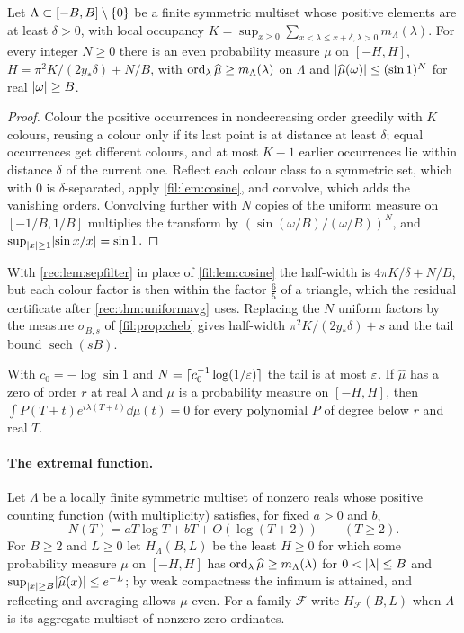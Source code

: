 \begin{theorem}\label{rec:thm:finitefilter}
Let $\Lambda\subset[-B,B]\setminus\{0\}$ be a finite symmetric multiset whose positive elements are at least $\delta>0$,
with local occupancy $K=\sup_{x\ge0}\sum_{x<\lambda\le x+\delta,\lambda>0}m_\Lambda(\lambda)$. For every integer $N\ge0$ there is an even
probability measure $\mu$ on $[-H,H]$, $H=\pi^2K/(2y_*\delta)+N/B$, with $\operatorname{ord}_\lambda\widehat\mu\ge m_\Lambda(\lambda)$ on $\Lambda$ and
$\lvert\widehat\mu(\omega)\rvert\le(\sin1)^N$ for real $\lvert\omega\rvert\ge B$.
\end{theorem}

\begin{proof}
Colour the positive occurrences in nondecreasing order greedily with $K$ colours, reusing a colour only
if its last point is at distance at least $\delta$; equal occurrences get different colours, and at most $K-1$
earlier occurrences lie within distance $\delta$ of the current one. Reflect each colour class to a symmetric
set, which with $0$ is $\delta$-separated, apply \cref{fil:lem:cosine}, and convolve, which adds the vanishing
orders. Convolving further with $N$ copies of the uniform measure on $[-1/B,1/B]$ multiplies the transform by
$(\sin(\omega/B)/(\omega/B))^N$, and $\sup_{\lvert x\rvert\ge1}\lvert\sin x/x\rvert=\sin1$.
\end{proof}

With \cref{rec:lem:sepfilter} in place of \cref{fil:lem:cosine} the half-width is $4\pi K/\delta+N/B$, but each
colour factor is then within the factor $\tfrac65$ of a triangle, which the residual certificate after
\cref{rec:thm:uniformavg} uses. Replacing the $N$ uniform factors by the measure $\sigma_{B,s}$ of
\cref{fil:prop:cheb} gives half-width $\pi^2K/(2y_*\delta)+s$ and the tail bound $\operatorname{sech}(sB)$.

With $c_0=-\log\sin1$ and $N=\lceil c_0^{-1}\log(1/\varepsilon)\rceil$ the tail is at most $\varepsilon$. If $\widehat\mu$ has a zero of order
$r$ at real $\lambda$ and $\mu$ is a probability measure on $[-H,H]$, then $\int P(T+t)e^{i\lambda(T+t)}\dd\mu(t)=0$ for every
polynomial $P$ of degree below $r$ and real $T$.

\paragraph{The extremal function.}
Let $\Lambda$ be a locally finite symmetric multiset of nonzero reals whose positive counting function
(with multiplicity) satisfies, for fixed $a>0$ and $b$,
\begin{equation}\label{fil:eq:count}
 N(T)=aT\log T+bT+O(\log(T+2))\qquad(T\ge2).
\end{equation}
For $B\ge2$ and $L\ge0$ let $H_\Lambda(B,L)$ be the least $H\ge0$ for which some probability measure $\mu$ on
$[-H,H]$ has $\operatorname{ord}_\lambda\widehat\mu\ge m_\Lambda(\lambda)$ for $0<\lvert\lambda\rvert\le B$ and
$\sup_{\lvert x\rvert\ge B}\lvert\widehat\mu(x)\rvert\le e^{-L}$; by weak compactness the infimum is attained, and
reflecting and averaging allows $\mu$ even. For a family $\mathcal F$ write $H_{\mathcal F}(B,L)$ when $\Lambda$
is its aggregate multiset of nonzero zero ordinates.

